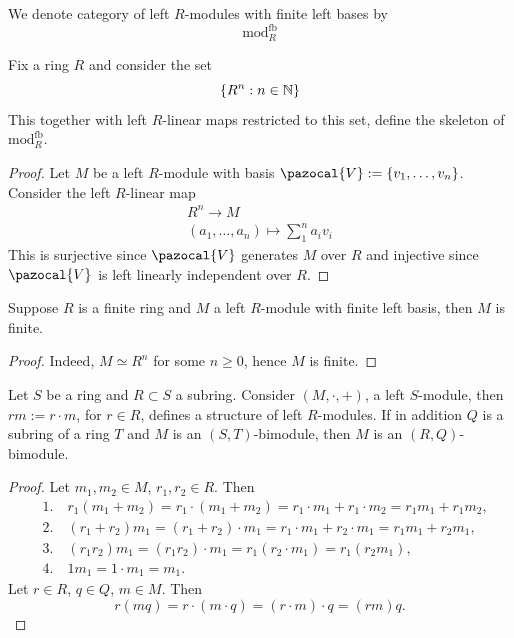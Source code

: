 We denote category of left $R$-modules with finite left bases by 
$$
    \mathrm{mod}_R^{\mathrm{fb}}
$$
\begin{lemma}
        Fix a ring $R$ and consider the set 
        $$
            \{R^n : n\in \mathbb{N}\}
        $$
        This together with left $R$-linear maps restricted to this set, define the skeleton of $\mathrm{mod}_R^{\mathrm{fb}}$.
    \end{lemma}
    \begin{proof}
        Let $M$ be a left $R$-module with basis $\pazocal{V}:=\{v_1,\dots,v_n\}$. Consider the left $R$-linear map 
        \begin{gather*}
            R^n \rightarrow M\\
            (a_1,\dots,a_n) \mapsto \sum_1^n a_iv_i
        \end{gather*}
        This is surjective since $\pazocal{V}$ generates $M$ over $R$ and injective since $\pazocal{V}$ is left linearly independent over $R$. 
    \end{proof}
\begin{corollary}\label{ModuleWithFiniteLeftBasisOverFiniteRingIsFinite}
    Suppose $R$ is a finite ring and $M$ a left $R$-module with finite left basis, then $M$ is finite. 
\end{corollary}
\begin{proof}
    Indeed, $M\simeq R^n$ for some $n\geq 0$, hence $M$ is finite. 
\end{proof}
\begin{proposition}
    Let $S$ be a ring and $R\subset S$ a subring. Consider $(M,\cdot,+)$, a left $S$-module, then $rm:= r\cdot m$, for $r\in R$, defines a structure of left $R$-modules. If in addition $Q$ is a subring of a ring $T$ and $M$ is an $(S,T)$-bimodule, then $M$ is an $(R,Q)$-bimodule.  
\end{proposition}
\begin{proof}
    Let $m_1,m_2\in M$, $r_1,r_2\in R$. Then
    \begin{align*}
        &1.\quad r_1(m_1+m_2)=r_1\cdot(m_1+m_2)=r_1\cdot m_1+r_1\cdot m_2=r_1m_1+r_1m_2,\\
        &2.\quad (r_1+r_2)m_1= (r_1+r_2)\cdot m_1=r_1\cdot m_1+r_2\cdot m_1=r_1m_1+r_2m_1,\\
        &3.\quad (r_1r_2)m_1=(r_1r_2)\cdot m_1 = r_1(r_2\cdot m_1)=r_1(r_2m_1),\\
        &4.\quad 1m_1=1\cdot m_1=m_1.
    \end{align*}
    Let $r\in R$, $q\in Q$, $m\in M$. Then
    $$r(mq)=r\cdot(m\cdot q)=(r\cdot m)\cdot q = (rm)q.$$
\end{proof}
